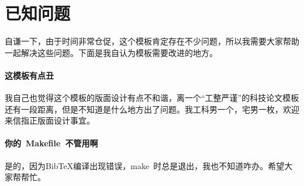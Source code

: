 

\chapter{已知问题}
\label{chap:needsomehelp}

自谦一下，由于时间非常仓促，这个模板肯定存在不少问题，所以我需要大家帮助一起解决这些问题。下面是我自认为模板需要改进的地方。

\subsubsection*{这模板有点丑}
我自己也觉得这个模板的版面设计有点不和谐，离一个“工整严谨”的科技论文模板还有一段距离，但是不知道是什么地方出了问题。我工科男一个，宅男一枚，欢迎来信指正版面设计事宜。

\subsubsection*{你的~Makefile~不管用啊}
是的，因为BibTeX编译出现错误，make~时总是退出，我也不知道咋办。希望大家帮帮忙。


